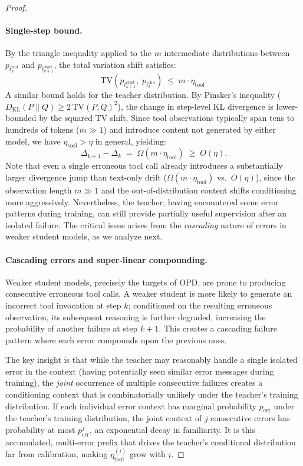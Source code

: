 \begin{proof}
\paragraph{Single-step bound.}
By the triangle inequality applied to the $m$ intermediate distributions between $p_{t_k^{\mathrm{end}}}$ and $p_{t_{k+1}^{\mathrm{start}}}$, the total variation shift satisfies:
\begin{equation}
    \mathrm{TV}\!\left(p_{t_{k+1}^{\mathrm{start}}},\; p_{t_k^{\mathrm{end}}}\right) \;\le\; m \cdot \eta_{\mathrm{tool}}.
\end{equation}
A similar bound holds for the teacher distribution. By Pinsker's inequality ($D_{\mathrm{KL}}(P\|Q) \ge 2\,\mathrm{TV}(P,Q)^2$), the change in step-level KL divergence is lower-bounded by the squared TV shift. Since tool observations typically span tens to hundreds of tokens ($m \gg 1$) and introduce content not generated by either model, we have $\eta_{\mathrm{tool}} > \eta$ in general, yielding:
\begin{equation}
    \Delta_{k+1} - \Delta_k \;=\; \Omega(m \cdot \eta_{\mathrm{tool}}) \;\ge\; O(\eta).
\end{equation}
Note that even a single erroneous tool call already introduces a substantially larger divergence jump than text-only drift ($\Omega(m \cdot \eta_{\mathrm{tool}})$ vs.\ $O(\eta)$), since the observation length $m \gg 1$ and the out-of-distribution content shifts conditioning more aggressively. Nevertheless, the teacher, having encountered some error patterns during training, can still provide partially useful supervision after an isolated failure. The critical issue arises from the \emph{cascading} nature of errors in weaker student models, as we analyze next.

\paragraph{Cascading errors and super-linear compounding.}
Weaker student models, precisely the targets of OPD, are prone to producing consecutive erroneous tool calls. A weaker student is more likely to generate an incorrect tool invocation at step $k$; conditioned on the resulting erroneous observation, its subsequent reasoning is further degraded, increasing the probability of another failure at step $k+1$. This creates a cascading failure pattern where each error compounds upon the previous ones.

The key insight is that while the teacher may reasonably handle a single isolated error in the context (having potentially seen similar error messages during training), the \emph{joint} occurrence of multiple consecutive failures creates a conditioning context that is combinatorially unlikely under the teacher's training distribution. If each individual error context has marginal probability $p_{\mathrm{err}}$ under the teacher's training distribution, the joint context of $j$ consecutive errors has probability at most $p_{\mathrm{err}}^j$, an exponential decay in familiarity. It is this accumulated, multi-error prefix that drives the teacher's conditional distribution far from calibration, making $\eta_{\mathrm{tool}}^{(i)}$ grow with $i$.


\end{proof}
